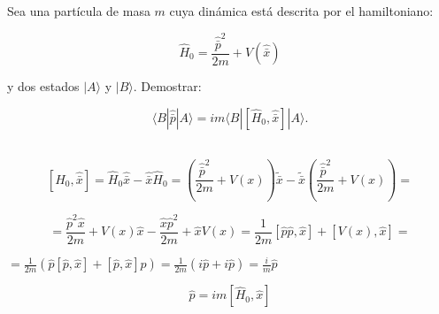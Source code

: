 Sea una partícula de masa $m$ cuya dinámica está descrita por el hamiltoniano: 

$$
{\hat{H}_{0}=\frac{\hat{\bar{p}}^{2}}{2 m}+V(\hat{\bar{x}})}
$$

y dos estados $| A\rangle$ y $| B \rangle$. Demostrar: 

$$
{\langle B|\hat{\bar{p}}| A\rangle=i m\langle B\left|\left[\hat{H}_{0}, \hat{\bar{x}} \right] \right| A\rangle}.
$$

\begin{solution}\ \\
$$
\left[\hat{H}_{0}, \hat{\bar{x}}\right]=\hat{H}_{0} \hat{\bar{x}}-\hat{\bar{x}} \hat{H}_{0}=\left(\frac{\hat{\bar{p}}^{2}}{2 m}+V(x)\right) \tilde{\bar{x}}-\tilde{\bar{x}}\left(\frac{\hat{\bar{p}}^{2}}{2 m}+V(x)\right)=
$$

$$
=\frac{\hat{p}^{2} \hat{x}}{2 m}+V(x) \hat{x}-\frac{\hat{x} \hat{p}^{2}}{2 m}+\hat{x} V(x)=\frac{1}{2 m}[\hat{p} \hat{p}, \hat{x}]+[V(x), \hat{x}]=
$$

$=\frac{1}{2 m}(\hat{p}[\hat{p}, \hat{x}]+[\hat{p}, \hat{x}] \hat{p})=\frac{1}{2 m}(i \hat{p}+i \hat{p})=\frac{i}{m} \hat{p}$

$$
\hat{p}=i m\left[\hat{H}_{0}, \hat{x}\right]
$$
\end{solution}